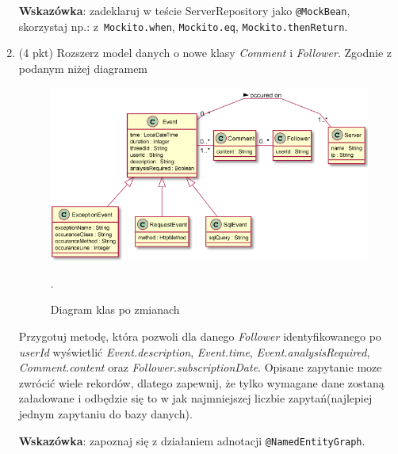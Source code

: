 \documentclass[12pt]{article}
\begin{document}
\begin{enumerate}
            \textbf{Wskazówka}: zadeklaruj w teście ServerRepository jako  \texttt{@MockBean}, skorzystaj np.: z~\texttt{Mockito\allowbreak .when}, \texttt{Mockito\allowbreak .eq}, \texttt{Mockito\allowbreak .thenReturn}.

        \item
         (4 pkt) Rozszerz model danych o nowe klasy \emph{Comment} i \emph{Follower}. Zgodnie z podanym niżej diagramem

        \begin{figure}[ht]
            \centering
            \includegraphics{lista4_class_diagram_2.png}
            \caption{Diagram klas po zmianach}.
            \label{fig:class-diagram}
        \end{figure}

        Przygotuj metodę, która pozwoli dla danego \emph{Follower} identyfikowanego po \emph{userId} wyświetlić \emph{Event.description}, \emph{Event.time}, \emph{Event.analysisRequired}, \emph{Comment.content} oraz \emph{Follower.subscriptionDate}. Opisane zapytanie moze zwrócić wiele rekordów, dlatego zapewnij, że tylko wymagane dane zostaną załadowane i odbędzie się to w jak najmniejszej liczbie zapytań(najlepiej jednym zapytaniu do bazy danych).

        \textbf{Wskazówka}: zapoznaj się z działaniem adnotacji \texttt{@NamedEntityGraph}.

    \end{enumerate}
\end{document}
